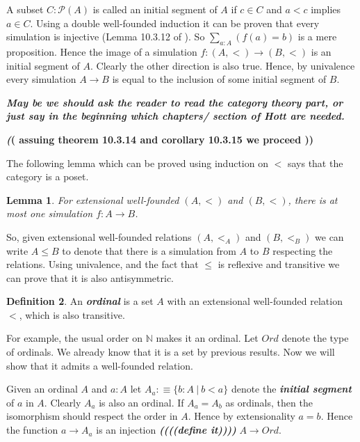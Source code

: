 \documentclass[11pt]{article}
\theoremstyle{definition}
\newtheorem{definition}{Definition}[section]
\theoremstyle{plain}
\newtheorem{lemma}[definition]{Lemma}
\theoremstyle{remark}
\newcommand{\Po}{\mathscr{P}}
\begin{document}
A subset $C : \Po (A)$ is called an initial segment of $A$ if $c \in C$ and $a < c$ implies
$a \in C$. Using a double well-founded induction it can be proven that every simulation is
injective (Lemma 10.3.12 of \cite{Hott}). So $\sum_{a : A} (f(a) = b)$ is a mere proposition.
Hence the image of a simulation $f : (A,<) \to (B,<)$ is an initial segment of $A$. Clearly
the other direction is also true. Hence, by univalence every simulation $A \to B$ is equal
to the inclusion of some initial segment of $B$.

\textbf{\textit{May be we should ask the reader to read the category theory part, or just say 
in the beginning which chapters/ section of Hott are needed.}}\smallskip

\textbf{\textit ((  assuing theorem 10.3.14 and corollary 10.3.15 we proceed ))}\smallskip

The following lemma which can be proved using induction on $<$ says that the category is a 
poset.

\begin{lemma}\label{L:Sim is uniq}
For extensional well-founded $(A,<)$ and $(B,<)$, there is at most one simulation $f : A \to B$.
\end{lemma}

So, given extensional well-founded relations $(A, <_A)$ and $(B, <_B)$ we can write $A \leq B$ 
to denote that there is a simulation from $A$ to $B$ respecting the relations. Using univalence,
and the fact that $\leq$ is reflexive and transitive we can prove that it is also 
antisymmetric.

\begin{definition}\label{D:Ordinal}
An \textbf{\textit{ordinal}} is a set $A$ with an extensional well-founded relation $<$, which
is also transitive.
\end{definition}

For example, the usual order on $\mathbb{N}$ makes it an ordinal. Let $Ord$ denote the type of
ordinals. We already know that it is a set by previous results. Now we will show that it admits
a well-founded relation.\smallskip

Given an ordinal $A$ and $a : A$ let $A_a :\equiv \{ b : A\ |\ b < a\}$ denote the 
\textbf{\textit{initial segment}} of $a$ in $A$. Clearly $A_a$ is also an ordinal. If 
$A_a = A_b$ as ordinals, then the isomorphism should respect the order in $A$. Hence by 
extensionality $a = b$. Hence the function $a \to A_a$ is an injection
\textbf{\textit{((((define it))))}} $A \to Ord$. 
\end{document}
